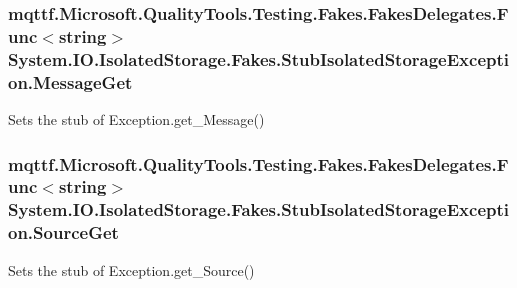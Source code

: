 \hypertarget{class_system_1_1_i_o_1_1_isolated_storage_1_1_fakes_1_1_stub_isolated_storage_exception_a708113b909286c1de7da60cb39e0853f}{
\subsubsection[{Message\-Get}]{\setlength{\rightskip}{0pt plus 5cm}mqttf.\-Microsoft.\-Quality\-Tools.\-Testing.\-Fakes.\-Fakes\-Delegates.\-Func$<$string$>$ System.\-I\-O.\-Isolated\-Storage.\-Fakes.\-Stub\-Isolated\-Storage\-Exception.\-Message\-Get}}\label{class_system_1_1_i_o_1_1_isolated_storage_1_1_fakes_1_1_stub_isolated_storage_exception_a708113b909286c1de7da60cb39e0853f}


Sets the stub of Exception.\-get\-\_\-\-Message()

\hypertarget{class_system_1_1_i_o_1_1_isolated_storage_1_1_fakes_1_1_stub_isolated_storage_exception_ad86e9446cae84dd518ff6797266893f4}{
\subsubsection[{Source\-Get}]{\setlength{\rightskip}{0pt plus 5cm}mqttf.\-Microsoft.\-Quality\-Tools.\-Testing.\-Fakes.\-Fakes\-Delegates.\-Func$<$string$>$ System.\-I\-O.\-Isolated\-Storage.\-Fakes.\-Stub\-Isolated\-Storage\-Exception.\-Source\-Get}}\label{class_system_1_1_i_o_1_1_isolated_storage_1_1_fakes_1_1_stub_isolated_storage_exception_ad86e9446cae84dd518ff6797266893f4}


Sets the stub of Exception.\-get\-\_\-\-Source()

